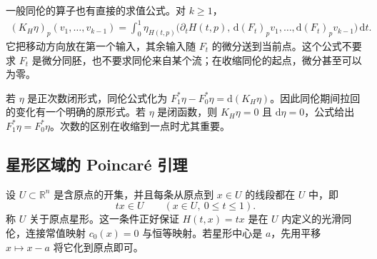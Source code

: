 一般同伦的算子也有直接的求值公式。对 \(k\ge1\)，
\begin{equation}
	\label{g1:eq:homotopy-map-operator}
	\begin{split}
		(K_H\eta)_p(v_1,\ldots,v_{k-1})
		=\int_0^1\eta_{H(t,p)}
		\bigl(\partial_tH(t,p),\,
		\mathrm{d}(F_t)_p v_1,\ldots,\mathrm{d}(F_t)_p v_{k-1}\bigr)\,\mathrm{d}t.
	\end{split}
\end{equation}
它把移动方向放在第一个输入，其余输入随 \(F_t\) 的微分送到当前点。这个公式不要求 \(F_t\) 是微分同胚，也不要求同伦来自某个流；在收缩同伦的起点，微分甚至可以为零。

\ProseParagraphBreak

若 \(\eta\) 是正次数闭形式，同伦公式化为 \(F_1^*\eta-F_0^*\eta=\mathrm{d}(K_H\eta)\)。因此同伦期间拉回的变化有一个明确的原形式。若 \(\eta\) 是闭函数，则 \(K_H\eta=0\) 且 \(\mathrm{d}\eta=0\)，公式给出 \(F_1^*\eta=F_0^*\eta\)。次数的区别在收缩到一点时尤其重要。

\subsection{星形区域的 Poincaré 引理}
\label{g1:subsec:1402:02}

设 \(U\subset\mathbb R^n\) 是含原点的开集，并且每条从原点到 \(x\in U\) 的线段都在 \(U\) 中，即
\[
	tx\in U\qquad(x\in U,\ 0\le t\le1).
\]
称 \(U\) 关于原点星形。这一条件正好保证 \(H(t,x)=tx\) 是在 \(U\) 内定义的光滑同伦，连接常值映射 \(c_0(x)=0\) 与恒等映射。若星形中心是 \(a\)，先用平移 \(x\mapsto x-a\) 将它化到原点即可。

